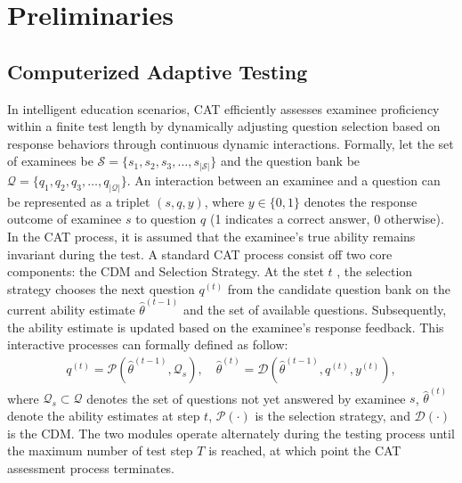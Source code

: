 \section{Preliminaries}
\subsection{Computerized Adaptive Testing}
In intelligent education scenarios, CAT efficiently assesses examinee proficiency within a finite test length by dynamically adjusting question selection based on response behaviors through continuous dynamic interactions. Formally, let the set of examinees be $\mathcal{S} = \{s_1, s_2, s_3, \dots, s_{|\mathcal{S}|}\}$ and the question bank be $\mathcal{Q} = \{q_1, q_2, q_3, \dots, q_{|\mathcal{Q}|}\}$. An interaction between an examinee and a question can be represented as a triplet $(s, q, y)$, where $y \in \{0, 1\}$ denotes the response outcome of examinee $s$ to question $q$ (1 indicates a correct answer, 0 otherwise). In the CAT process, it is assumed that the examinee's true ability remains invariant during the test. A standard CAT process consist off two core components: the CDM and Selection Strategy. At the stet $t$ , the selection strategy chooses the next question $q^{(t)}$ from  the candidate question bank on the current ability estimate $\hat{\theta}^{(t-1)}$ and the set of available questions. Subsequently, the ability estimate is updated based on the examinee's response feedback. This interactive processes can formally defined as follow:
\begin{align}
    q^{(t)} = \mathcal{P}(\hat{\theta}^{(t-1)}, \mathcal{Q}_s), \quad \hat{\theta}^{(t)} = \mathcal{D}(\hat{\theta}^{(t-1)},q^{(t)},y^{(t)}),
\end{align}
where $\mathcal{Q}_s \subset \mathcal{Q}$ denotes the set of questions not yet answered by examinee $s$,   $\hat{\theta}^{(t)}$ denote the ability estimates at  step $t$, $\mathcal{P}(\cdot)$ is the selection strategy, and $\mathcal{D}(\cdot)$ is the CDM. The two modules operate alternately during the testing process until the maximum number of test step $T$ is reached, at which point the CAT assessment process terminates.




